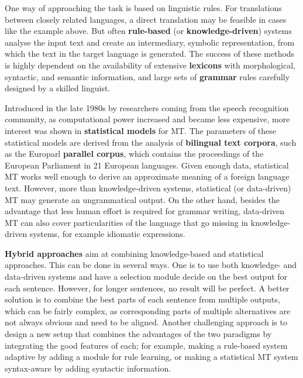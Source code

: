 \begin{multicols}{2}
One way of approaching the task is based on linguistic rules. For
translations between closely related languages, a direct translation
may be feasible in cases like the example above. But often {\bf rule-based}
(or {\bf knowledge-driven}) systems analyse the input text and create an
intermediary, symbolic representation, from which the text in the
target language is generated. The success of these methods is highly
dependent on the availability of extensive {\bf lexicons} with
morphological, syntactic, and semantic information, and large sets of
{\bf grammar} rules carefully designed by a skilled linguist.

Introduced in the late 1980s by researchers coming from the speech
recognition community, as computational power increased and became
less expensive, more interest was shown in {\bf statistical models} for
MT. The parameters of these statistical models are derived from the
analysis of {\bf bilingual text corpora}, such as the Europarl {\bf parallel
corpus}, which contains the proceedings of the European Parliament in
21 European languages. Given enough data, statistical MT works well
enough to derive an approximate meaning of a foreign language
text. However, more than knowledge-driven systems, statistical (or
data-driven) MT may generate an ungrammatical output. On the other
hand, besides the advantage that less human effort is required for
grammar writing, data-driven MT can also cover particularities of the
language that go missing in knowledge-driven systems, for example
idiomatic expressions.

{\bf Hybrid approaches} aim at combining knowledge-based and statistical
approaches. This can be done in several ways. One is to use both
knowledge- and data-driven systems and have a selection module decide
on the best output for each sentence. However, for longer sentences,
no result will be perfect. A better solution is to combine the best
parts of each sentence from multiple outputs, which can be fairly
complex, as corresponding parts of multiple alternatives are not
always obvious and need to be aligned. Another challenging approach is
to design a new setup that combines the advantages of the two
paradigms by integrating the good features of each; for example,
making a rule-based system adaptive by adding a module for rule
learning, or making a statistical MT system syntax-aware by adding
syntactic information.


\end{multicols}
